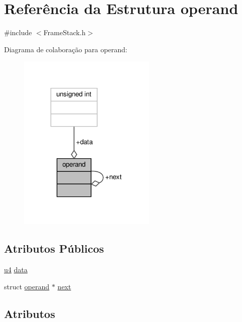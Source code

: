 \hypertarget{structoperand}{}\section{Referência da Estrutura operand}
\label{structoperand}


{\ttfamily \#include $<$Frame\+Stack.\+h$>$}



Diagrama de colaboração para operand\+:\nopagebreak
\begin{figure}[H]
\begin{center}
\leavevmode
\includegraphics[width=186pt]{structoperand__coll__graph}
\end{center}
\end{figure}
\subsection*{Atributos Públicos}
\begin{DoxyCompactItemize}
\item 
\hyperlink{ClassLoader_8h_aedf6ddc03df8caaaccbb4c60b9a9b850}{u4} \hyperlink{structoperand_a837c1053ce4d46fe295fbbe0f16c25ff}{data}
\item 
struct \hyperlink{structoperand}{operand} $\ast$ \hyperlink{structoperand_abdf650090955fbf7cb74c6d8cbc12eef}{next}
\end{DoxyCompactItemize}


\subsection{Atributos}
\mbox{\label{structoperand_a837c1053ce4d46fe295fbbe0f16c25ff}} 
